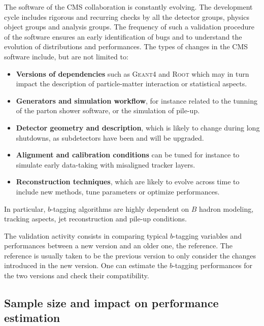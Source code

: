     The software of the CMS collaboration is constantly evolving. The
    development cycle includes rigorous and recurring checks by all the detector
    groups, physics object groups and analysis groups. The frequency of such a
    validation procedure of the software ensures an early identification of bugs
    and to understand the evolution of distributions and performances. The types
    of changes in the CMS software include, but are not limited to:
    \begin{itemize}
        \item \textbf{Versions of dependencies} such as \textsc{Geant4} and
            \textsc{Root} which may in turn impact the description of
            particle-matter interaction or statistical aspects.
        \item \textbf{Generators and simulation workflow}, for instance related
            to the tunning of the parton shower software, or the simulation of
            pile-up.
        \item \textbf{Detector geometry and description}, which is likely to
            change during long shutdowns, as subdetectors have been and will be
            upgraded.
        \item \textbf{Alignment and calibration conditions} can be tuned for
            instance to simulate early data-taking with misaligned tracker
            layers.
        \item \textbf{Reconstruction techniques}, which are likely to evolve
            across time to include new methods, tune parameters or optimize
            performances.
    \end{itemize}

    In particular, $b$-tagging algorithms are highly dependent on $B$ hadron
    modeling, tracking aspects, jet reconstruction and pile-up conditions.

    The validation activity consists in comparing typical $b$-tagging variables
    and performances between a new version and an older one, the reference. The
    reference is usually taken to be the previous version to only consider the
    changes introduced in the new version.  One can estimate the $b$-tagging
    performances for the two versions and check their compatibility.

    \subsection{Sample size and impact on performance estimation}

